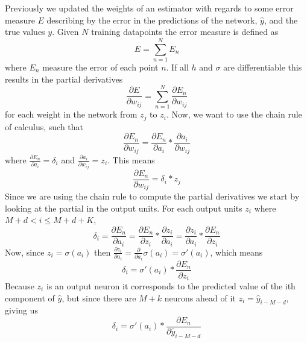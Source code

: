 \documentclass[11pt]{article}
\begin{document}
Previously we updated the weights of an estimator with regards to some error measure $E$
describing by the error in the predictions of the network, $\hat{y}$, and the true values $y$.
Given $N$ training datapoints the error measure is defined as
\begin{equation}
    E = \sum\limits_{n=1}^N E_n
\end{equation}
where $E_n$ measure the error of each point $n$.
If all $h$ and $\sigma$ are differentiable this results in the partial derivatives
\begin{equation*}
    \frac{\partial E}{\partial w_{ij}} = \sum\limits_{n=1}^N \frac{\partial E_n}{\partial w_{ij}}
\end{equation*}
for each weight in the network from $z_j$ to $z_i$.
Now, we want to use the chain rule of calculus, such that
\begin{equation*}
    \frac{\partial E_n}{\partial w_{ij}} = \frac{\partial E_n}{\partial a_{i}} * \frac{\partial a_i}{\partial w_{ij}}
\end{equation*}
where $\frac{\partial E_n}{\partial a_{i}} = \delta_i$ and $\frac{\partial a_i}{\partial w_{ij}} = z_i$.
This means
\begin{equation}\label{eq:back_prop}
    \frac{\partial E_n}{\partial w_{ij}} = \delta_i * z_j
\end{equation}
Since we are using the chain rule to compute the partial derivatives we start by looking at
the partial in the output units.
For each output units $z_i$ where $M + d < i \leq M + d + K$,
\begin{equation*}
    \delta_i = \frac{\partial E_n}{\partial a_i} = \frac{\partial E_n}{\partial z_i} * \frac{\partial z_i}{\partial a_i} = \frac{\partial z_i}{\partial a_i} * \frac{\partial E_n}{\partial z_i}
\end{equation*}
Now, since $z_i = \sigma(a_i)$ then $\frac{\partial z_i}{\partial a_i} = \frac{\partial}{\partial a_i} \sigma(a_i) = \sigma'(a_i)$,
which means
\begin{equation*}
    \delta_i = \sigma'(a_i) * \frac{\partial E_n}{\partial z_i} 
\end{equation*}
Because $z_i$ is an output neuron it corresponds to the predicted value of the ith component of $\hat{y}$,
but since there are $M + k$ neurons ahead of it $z_i = \hat{y}_{i - M - d}$, giving us
\begin{equation*}
    \delta_i = \sigma'(a_i) * \frac{\partial E_n}{\partial \hat{y}_{i - M - d}} 
\end{equation*}
\end{document}

